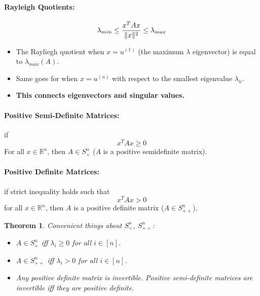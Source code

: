 \documentclass[a4paper,12pt]{report}
\DeclarePairedDelimiter\norm{\lVert}{\rVert}%
\def\reals{\mathbb{R}}
\newtheorem{theorem}{Theorem}
\begin{document}
\paragraph{Rayleigh Quotients: } 
\begin{equation}
\lambda_{min} \leq \frac{x^T A x}{\norm{x}^2} \leq \lambda_{max}
\end{equation}

\begin{itemize}
\item The Rayliegh quotient when $x = u^{(1)}$ (the maximum $\lambda$ eigenvector) is equal to $\lambda_{max}(A)$.
\item Same goes for when $x = u^{(n)}$ with respect to the smallest eigenvalue $\lambda_n$.

\item \textbf{This connects eigenvectors and singular values.} 
\end{itemize}

\paragraph{Positive Semi-Definite Matrices: } if \begin{equation}
x^T A x \geq 0
\end{equation}
For all $x\in \reals^n$, then $A\in S^n_+$ ($A$ is a positive semidefinite matrix).

\paragraph{Positive Definite Matrices: } if strict inequality holds such that 
\begin{equation}
x^T A x > 0
\end{equation}
for all $x\in \reals^n$, then $A$ is a positive definite matrix ($A\in S^n_{++}$).

\begin{theorem}{Convenient things about $S_+^n$, $S_{++}^n$: }
\begin{itemize}
\item $A\in S^n_+$ iff $\lambda_i \geq 0$ for all $i\in [n]$.
\item $A\in S^n_{++}$ iff $\lambda_i > 0$ for all $i \in [n]$.
\item Any positive definite matrix is invertible. \textit{Positive semi-definite matrices are invertible iff they are positive definite}. 
\end{itemize}
\end{theorem}
\end{document}
